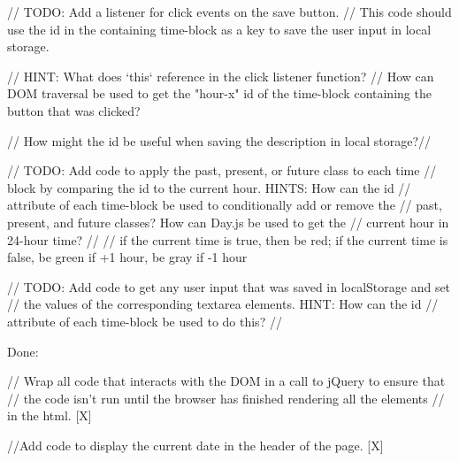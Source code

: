 // TODO: Add a listener for click events on the save button.
  // This code should use the id in the containing time-block as a key to save the user input in local storage.

  // HINT: What does `this` reference in the click listener function?
  // How can DOM traversal be used to get the "hour-x" id of the time-block containing the button that was clicked?


  // How might the id be useful when saving the description in local storage?//

  // TODO: Add code to apply the past, present, or future class to each time
  // block by comparing the id to the current hour. HINTS: How can the id
  // attribute of each time-block be used to conditionally add or remove the
  // past, present, and future classes? How can Day.js be used to get the
  // current hour in 24-hour time?
  //
 // if the current time is true, then be red; if the current time is false, be green if +1 hour, be gray if -1 hour


  // TODO: Add code to get any user input that was saved in localStorage and set
  // the values of the corresponding textarea elements. HINT: How can the id
  // attribute of each time-block be used to do this?
  //





Done: 

// Wrap all code that interacts with the DOM in a call to jQuery to ensure that
// the code isn't run until the browser has finished rendering all the elements
// in the html. [X]

//Add code to display the current date in the header of the page. [X]

 